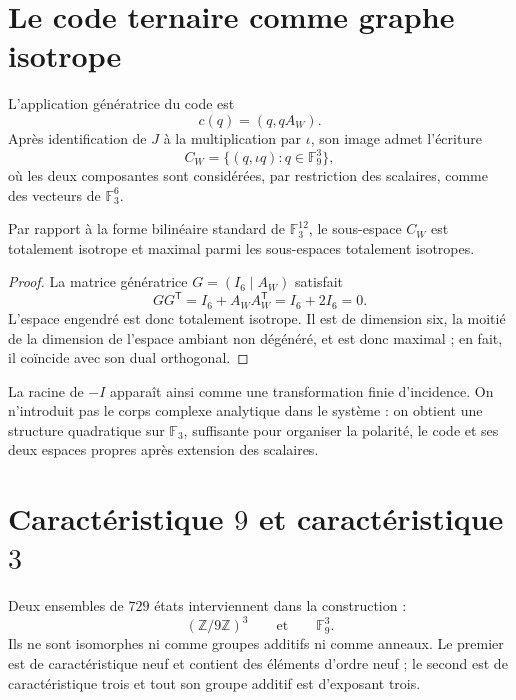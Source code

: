 \section{Le code ternaire comme graphe isotrope}

L'application génératrice du code est
\[
 c(q)=(q,qA_W).
\]
Après identification de \(J\) à la multiplication par \(\iota\), son image
admet l'écriture
\[
 C_W=\{(q,\iota q):q\in\mathbb F_9^3\},
\]
où les deux composantes sont considérées, par restriction des scalaires, comme des
vecteurs de \(\mathbb F_3^6\).

\begin{proposition}
\label{prop:golay-grafo-isotropico}
Par rapport à la forme bilinéaire standard de \(\mathbb F_3^{12}\), le
sous-espace \(C_W\) est totalement isotrope et maximal parmi les sous-espaces
totalement isotropes.
\end{proposition}

\begin{proof}
La matrice génératrice \(G=(I_6\mid A_W)\) satisfait
\[
 GG^{\mathsf T}=I_6+A_WA_W^{\mathsf T}=I_6+2I_6=0.
\]
L'espace engendré est donc totalement isotrope. Il est de
dimension six, la moitié de la dimension de l'espace ambiant non dégénéré,
et est donc maximal ; en fait, il coïncide avec son dual orthogonal.
\end{proof}

La racine de \(-I\) apparaît ainsi comme une transformation finie d'incidence.
On n'introduit pas le corps complexe analytique dans le système : on obtient une
structure quadratique sur \(\mathbb F_3\), suffisante pour organiser la
polarité, le code et ses deux espaces propres après extension des
scalaires.

\section{Caractéristique \(9\) et caractéristique \(3\)}

Deux ensembles de \(729\) états interviennent dans la construction :
\[
 (\mathbb Z/9\mathbb Z)^3
 \qquad\text{et}\qquad
 \mathbb F_9^3.
\]
Ils ne sont isomorphes ni comme groupes additifs ni comme anneaux. Le premier est de
caractéristique neuf et contient des éléments d'ordre neuf ; le second est de
caractéristique trois et tout son groupe additif est d'exposant trois.

